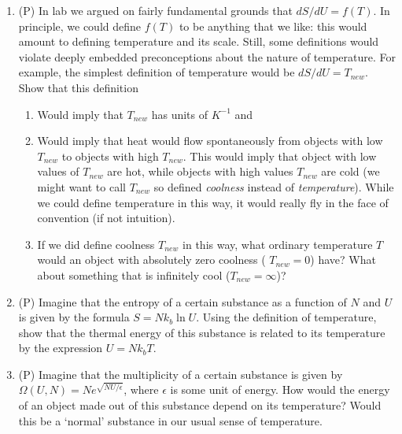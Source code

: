 \begin{enumerate}
\item (P) In lab we argued on fairly fundamental grounds 
that $dS/dU = f(T)$.  In principle, we could define $f(T)$ to be anything 
that we like:  this would amount to defining temperature and its scale. 
Still, some definitions would violate deeply embedded preconceptions 
about the nature of temperature.  
For example, the simplest definition of temperature would be $dS/dU = T_{new}$.  
Show that this definition
\begin{enumerate}
\item Would imply that $T_{new}$ has units of $K^{-1}$ and
\item Would imply that heat would flow spontaneously from objects with 
low $T_{new}$ to objects with high $T_{new}$.  
This would imply that object with low values of $T_{new}$ are hot, while 
objects with high values $T_{new}$ are cold (we might want to call $T_{new}$ 
so defined {\it coolness} instead of {\it temperature}).  
While we could define temperature in this way, it would really fly 
in the face of convention (if not intuition).
\item If we did define coolness $T_{new}$ in this way, what ordinary 
temperature $T$ would an object with absolutely zero coolness (
$T_{new} = 0$) have?  What about something that is infinitely cool ($T_{new} = \infty$)?
\end{enumerate}

\item (P) Imagine that the entropy of a certain substance as a function of 
$N$ and $U$ is given by the formula $S = Nk_b \ln U$. Using the definition of temperature, 
show that the thermal energy of this substance is related to its temperature 
by the expression $U=Nk_b T$.

\item (P) Imagine that the multiplicity of a certain substance is 
given by $\Omega(U,N) = Ne^{\sqrt{NU/\epsilon}}$, where $\epsilon$ is some unit of energy.  
How would the energy of an object made out of this substance depend 
on its temperature?  Would this be a `normal' substance in our usual sense 
of temperature.


\end{enumerate}
